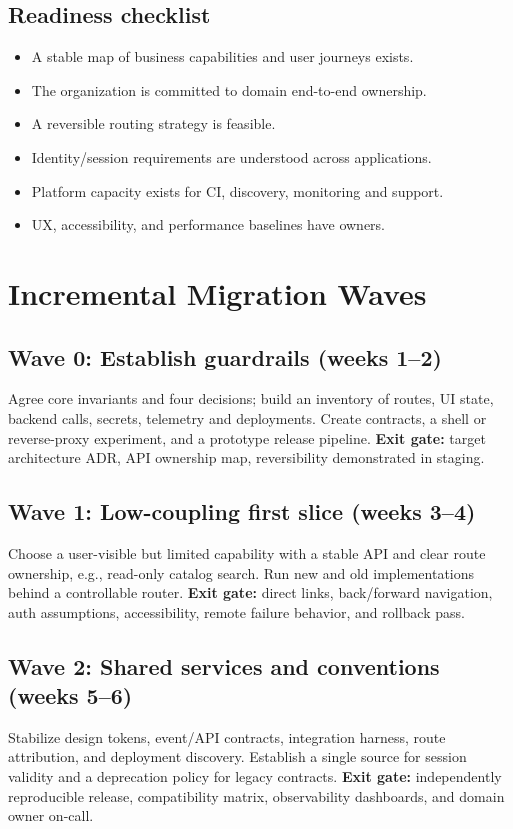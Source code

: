 \documentclass[11pt,letterpaper,oneside]{report}
\begin{document}
\section{Readiness checklist}
\begin{itemize}[label=$\square$]\item A stable map of business capabilities and user journeys exists.
\item The organization is committed to domain end-to-end ownership.
\item A reversible routing strategy is feasible.
\item Identity/session requirements are understood across applications.
\item Platform capacity exists for CI, discovery, monitoring and support.
\item UX, accessibility, and performance baselines have owners.\end{itemize}
\chapter{Incremental Migration Waves}
\section{Wave 0: Establish guardrails (weeks 1--2)}
Agree core invariants and four decisions; build an inventory of routes, UI state, backend calls, secrets, telemetry and deployments. Create contracts, a shell or reverse-proxy experiment, and a prototype release pipeline. \textbf{Exit gate:} target architecture ADR, API ownership map, reversibility demonstrated in staging.
\section{Wave 1: Low-coupling first slice (weeks 3--4)}
Choose a user-visible but limited capability with a stable API and clear route ownership, e.g., read-only catalog search. Run new and old implementations behind a controllable router. \textbf{Exit gate:} direct links, back/forward navigation, auth assumptions, accessibility, remote failure behavior, and rollback pass.
\section{Wave 2: Shared services and conventions (weeks 5--6)}
Stabilize design tokens, event/API contracts, integration harness, route attribution, and deployment discovery. Establish a single source for session validity and a deprecation policy for legacy contracts. \textbf{Exit gate:} independently reproducible release, compatibility matrix, observability dashboards, and domain owner on-call.
\end{document}

